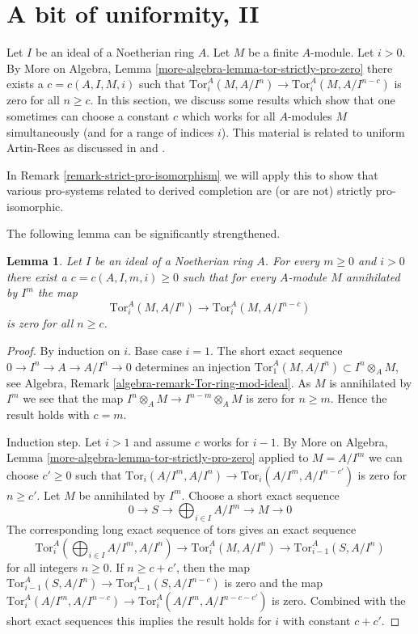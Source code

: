 \documentclass{stacks-project}
\theoremstyle{plain}
\newtheorem{lemma}[subsection]{Lemma}
\theoremstyle{definition}
\theoremstyle{remark}
\numberwithin{equation}{subsection}
\begin{document}
\section{A bit of uniformity, II}
\label{section-uniform-vanishing-bis}

\noindent
Let $I$ be an ideal of a Noetherian ring $A$. Let $M$ be a finite
$A$-module. Let $i > 0$. By More on Algebra, Lemma
\ref{more-algebra-lemma-tor-strictly-pro-zero}
there exists a $c = c(A, I, M, i)$ such that
$\text{Tor}^A_i(M, A/I^n) \to \text{Tor}^A_i(M, A/I^{n - c})$
is zero for all $n \geq c$. In this section, we discuss
some results which show that one sometimes can choose
a constant $c$ which works for all $A$-modules $M$ simultaneously
(and for a range of indices $i$).
This material is related to uniform Artin-Rees as discussed in
\cite{Huneke-uniform} and \cite{AHS}.

\medskip\noindent
In Remark \ref{remark-strict-pro-isomorphism} we will apply this to show that
various pro-systems related to derived completion are (or are not)
strictly pro-isomorphic.

\medskip\noindent
The following lemma can be significantly strengthened.

\begin{lemma}
\label{lemma-maps-zero-fixed-torsion}
Let $I$ be an ideal of a Noetherian ring $A$. For every $m \geq 0$
and $i > 0$ there exist a $c = c(A, I, m, i) \geq 0$ such that
for every $A$-module $M$ annihilated by $I^m$ the map
$$
\text{Tor}^A_i(M, A/I^n) \to \text{Tor}^A_i(M, A/I^{n - c})
$$
is zero for all $n \geq c$.
\end{lemma}

\begin{proof}
By induction on $i$. Base case $i = 1$. The short exact sequence
$0 \to I^n \to A \to A/I^n \to 0$ determines an injection
$\text{Tor}_1^A(M, A/I^n) \subset I^n \otimes_A M$, see
Algebra, Remark \ref{algebra-remark-Tor-ring-mod-ideal}.
As $M$ is annihilated by $I^m$ we see that the map
$I^n \otimes_A M \to I^{n - m} \otimes_A M$ is
zero for $n \geq m$. Hence the result holds with $c = m$.

\medskip\noindent
Induction step. Let $i > 1$ and assume $c$ works for $i - 1$.
By More on Algebra, Lemma \ref{more-algebra-lemma-tor-strictly-pro-zero}
applied to $M = A/I^m$ we can choose $c' \geq 0$ such that
$\text{Tor}_i(A/I^m, A/I^n) \to \text{Tor}_i(A/I^m, A/I^{n - c'})$
is zero for $n \geq c'$. Let $M$ be annihilated by $I^m$. Choose a short
exact sequence
$$
0 \to S \to \bigoplus\nolimits_{i \in I} A/I^m \to M \to 0
$$
The corresponding long exact sequence of tors gives an exact sequence
$$
\text{Tor}_i^A(\bigoplus\nolimits_{i \in I} A/I^m, A/I^n) \to
\text{Tor}_i^A(M, A/I^n) \to
\text{Tor}_{i - 1}^A(S, A/I^n)
$$
for all integers $n \geq 0$. If $n \geq c + c'$, then the map
$\text{Tor}_{i - 1}^A(S, A/I^n) \to \text{Tor}_{i - 1}^A(S, A/I^{n - c})$
is zero and the map $\text{Tor}_i^A(A/I^m, A/I^{n - c}) \to 
\text{Tor}_i^A(A/I^m, A/I^{n - c - c'})$ is zero. Combined with the
short exact sequences this implies the result holds for $i$ with
constant $c + c'$.
\end{proof}
\end{document}
